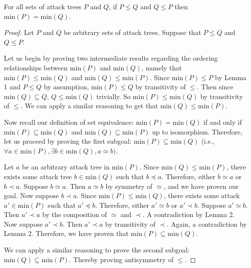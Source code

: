 \documentclass[runningheads]{llncs}
\theoremstyle{definition}
\begin{document}
\begin{theorem}
  For all sets of attack trees $P$ and $Q$, if $P \le Q$ and $Q \le P$
  then $\text{min}(P) = \text{min}(Q)$. 
\end{theorem}
\begin{proof}
  Let $P$ and $Q$ be arbitrary sets of attack trees. Suppose that $P
  \le Q$ and $Q \le P$.  
  
  Let us begin by proving two intermediate results regarding the
  ordering relationships between $\text{min}(P)$ and $\text{min}(Q)$,
  namely that $\text{min}(P) \leq \text{min}(Q)$ and $\text{min}(Q)
  \leq \text{min}(P)$. Since $\text{min}(P) \leq P$ by Lemma 1 and $P
  \leq Q$ by assumption, $\text{min}(P) \leq Q$ by transitivity of
  $\leq$. Then since $\text{min}(Q) \subseteq Q$, $Q \leq \text{min}(Q)$
  trivially. So $\text{min}(P) \leq \text{min}(Q)$ by transitivity of
  $\leq$. We can apply a similar reasoning to get
  that $\text{min}(Q) \leq \text{min}(P)$. 

  Now recall our definition of set equivalence: $\text{min}(P) =
  \text{min}(Q)$ if and only if $\text{min}(P) \subseteq
  \text{min}(Q)$ and $\text{min}(Q) \subseteq \text{min}(P)$ up to
  isomorphism. Therefore, let us proceed by proving the first subgoal:
  $\text{min}(P) \subseteq \text{min}(Q)$ (i.e.,
  $\forall a \in \text{min}(P), \exists b \in \text{min}(Q), a \simeq
  b)$.  
   
  Let $a$ be an arbitrary attack tree in $\text{min}(P)$.  
  Since $\text{min}(Q) \leq \text{min}(P)$, there exists some attack
  tree $b \in \text{min}(Q)$ such that $b \preceq a$. Therefore,
  either $b \simeq a$ or $b \prec a$. Suppose $b \simeq a$. Then $a
  \simeq b$ by symmetry of $\simeq$, and we have proven our goal.
  Now suppose $b \prec a$. Since $\text{min}(P) \leq \text{min}(Q)$, 
  there exists some attack $a' \in \text{min}(P)$ such
  that $a' \preceq b$. Therefore, either $a' \simeq b$ or $a' \prec b$. 
  Suppose $a' \simeq b$. Then $a' \prec a$ by the composition of $\simeq$
  and $\prec$. A contradiction by Lemma 2. Now suppose $a' \prec b$. 
  Then $a' \prec a$ by transitivity of $\prec$. Again, a contradiction by 
  Lemma 2. Therefore, we have proven that 
  $\text{min}(P) \subseteq \text{min}(Q)$. 

  We can apply a similar reasoning to prove the second subgoal:
  $\text{min}(Q) \subseteq \text{min}(P)$. Thereby
  proving antisymmetry of $\leq$. 
\end{proof}
\end{document}
